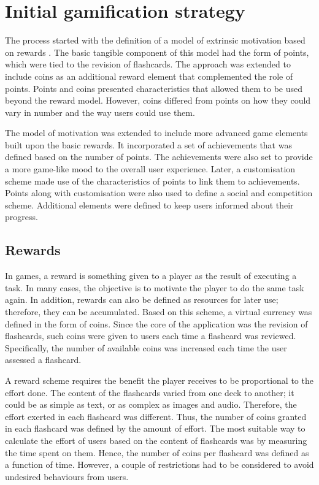 \section{Initial gamification strategy}
\label{desi-gamification-strategy}
The process started with the definition of a model of extrinsic motivation based on rewards \citep{richter2015studying}. The basic tangible component of this model had the form of points, which were tied to the revision of flashcards. The approach was extended to include coins as an additional reward element that complemented the role of points. Points and coins presented characteristics that allowed them to be used beyond the reward model. However, coins differed from points on how they could vary in number and the way users could use them.

The model of motivation was extended to include more advanced game elements built upon the basic rewards. It incorporated a set of achievements that was defined based on the number of points. The achievements were also set to provide a more game-like mood to the overall user experience. Later, a customisation scheme made use of the characteristics of points to link them to achievements. Points along with customisation were also used to define a social and competition scheme. Additional elements were defined to keep users informed about their progress.

\subsection{Rewards}
In games, a reward is something given to a player as the result of executing a task. In many cases, the objective is to motivate the player to do the same task again. In addition, rewards can also be defined as resources for later use; therefore, they can be accumulated. Based on this scheme, a virtual currency was defined in the form of coins. Since the core of the application was the revision of flashcards, such coins were given to users each time a flashcard was reviewed. Specifically, the number of available coins was increased each time the user assessed a flashcard.

A reward scheme requires the benefit the player receives to be proportional to the effort done. The content of the flashcards varied from one deck to another; it could be as simple as text, or as complex as images and audio. Therefore, the effort exerted in each flashcard was different. Thus, the number of coins granted in each flashcard was defined by the amount of effort. The most suitable way to calculate the effort of users based on the content of flashcards was by measuring the time spent on them. Hence, the number of coins per flashcard was defined as a function of time. However, a couple of restrictions had to be considered to avoid undesired behaviours from users.


